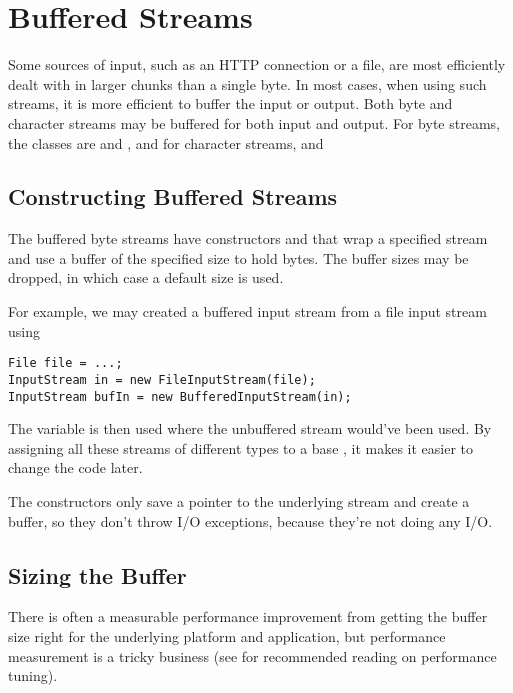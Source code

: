\section{Buffered Streams}

Some sources of input, such as an HTTP connection or a file, are most
efficiently dealt with in larger chunks than a single byte.  In most
cases, when using such streams, it is more efficient to buffer the
input or output.  Both byte and character streams may be buffered for
both input and output.  For byte streams, the classes are
 and , and for
character streams,  and 

\subsection{Constructing Buffered Streams}

The buffered byte streams have constructors
 and
 that wrap a specified
stream and use a buffer of the specified size to hold bytes.  
The buffer sizes may be dropped, in which case a default size is used.

For example, we may created a buffered input stream from
a file input stream using
%
\begin{verbatim}
File file = ...;
InputStream in = new FileInputStream(file);
InputStream bufIn = new BufferedInputStream(in);
\end{verbatim}
%
The variable  is then used where the unbuffered stream
 would've been used.  By assigning all these streams of
different types to a base , it makes it easier to
change the code later.

The constructors only save a pointer to the underlying stream and
create a buffer, so they don't throw I/O exceptions, because they're
not doing any I/O.

\subsection{Sizing the Buffer}

There is often a measurable performance improvement from getting the
buffer size right for the underlying platform and application, but
performance measurement is a tricky business (see
 for recommended reading on performance tuning).

